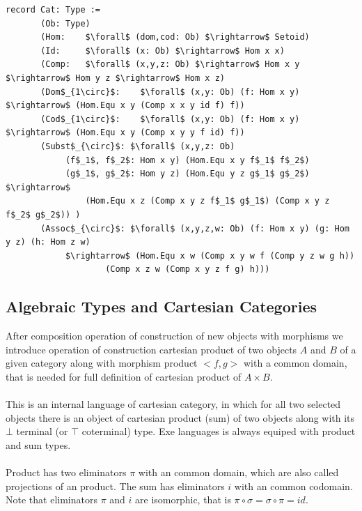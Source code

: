 \documentclass[11pt,oneside]{article}
\begin{document}
\begin{lstlisting}[mathescape=true]
record Cat: Type :=
       (Ob: Type)
       (Hom:    $\forall$ (dom,cod: Ob) $\rightarrow$ Setoid)
       (Id:     $\forall$ (x: Ob) $\rightarrow$ Hom x x)
       (Comp:   $\forall$ (x,y,z: Ob) $\rightarrow$ Hom x y $\rightarrow$ Hom y z $\rightarrow$ Hom x z)
       (Dom$_{1\circ}$:    $\forall$ (x,y: Ob) (f: Hom x y) $\rightarrow$ (Hom.Equ x y (Comp x x y id f) f))
       (Cod$_{1\circ}$:    $\forall$ (x,y: Ob) (f: Hom x y) $\rightarrow$ (Hom.Equ x y (Comp x y y f id) f))
       (Subst$_{\circ}$: $\forall$ (x,y,z: Ob)
            (f$_1$, f$_2$: Hom x y) (Hom.Equ x y f$_1$ f$_2$)
            (g$_1$, g$_2$: Hom y z) (Hom.Equ y z g$_1$ g$_2$) $\rightarrow$
                (Hom.Equ x z (Comp x y z f$_1$ g$_1$) (Comp x y z f$_2$ g$_2$)) )
       (Assoc$_{\circ}$: $\forall$ (x,y,z,w: Ob) (f: Hom x y) (g: Hom y z) (h: Hom z w)
            $\rightarrow$ (Hom.Equ x w (Comp x y w f (Comp y z w g h))
                    (Comp x z w (Comp x y z f g) h)))
\end{lstlisting}

\newpage
\subsection{Algebraic Types and Cartesian Categories}

After composition operation of construction of new objects with morphisms we introduce
operation of construction cartesian product of two objects $A$ and $B$ of a given
category along with morphism product $<f,g>$ with a common domain, that is needed
for full definition of cartesian product of $A \times B$.

\paragraph{}
This is an internal language of cartesian category, in which for all two selected objects there is an object
of cartesian product (sum) of two objects along with its $\bot$ terminal (or $\top$ coterminal) type.
Exe languages is always equiped with product and sum types.

\paragraph{}
Product has two eliminators $\pi$ with an common domain, which are also called projections of an product.
The sum has eliminators $i$ with an common codomain.
Note that eliminators $\pi$ and $i$ are isomorphic, that is $\pi \circ \sigma = \sigma \circ \pi = id$.
\end{document}
